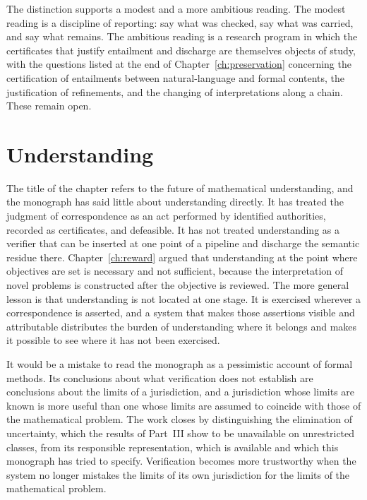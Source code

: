 The distinction supports a modest and a more ambitious reading. The modest reading is a discipline of reporting: say what was checked, say what was carried, and say what remains. The ambitious reading is a research program in which the certificates that justify entailment and discharge are themselves objects of study, with the questions listed at the end of Chapter~\ref{ch:preservation} concerning the certification of entailments between natural-language and formal contents, the justification of refinements, and the changing of interpretations along a chain. These remain open.

\section{Understanding}

The title of the chapter refers to the future of mathematical understanding, and the monograph has said little about understanding directly. It has treated the judgment of correspondence as an act performed by identified authorities, recorded as certificates, and defeasible. It has not treated understanding as a verifier that can be inserted at one point of a pipeline and discharge the semantic residue there. Chapter~\ref{ch:reward} argued that understanding at the point where objectives are set is necessary and not sufficient, because the interpretation of novel problems is constructed after the objective is reviewed. The more general lesson is that understanding is not located at one stage. It is exercised wherever a correspondence is asserted, and a system that makes those assertions visible and attributable distributes the burden of understanding where it belongs and makes it possible to see where it has not been exercised.

It would be a mistake to read the monograph as a pessimistic account of formal methods. Its conclusions about what verification does not establish are conclusions about the limits of a jurisdiction, and a jurisdiction whose limits are known is more useful than one whose limits are assumed to coincide with those of the mathematical problem. The work closes by distinguishing the elimination of uncertainty, which the results of Part~III show to be unavailable on unrestricted classes, from its responsible representation, which is available and which this monograph has tried to specify. Verification becomes more trustworthy when the system no longer mistakes the limits of its own jurisdiction for the limits of the mathematical problem.
